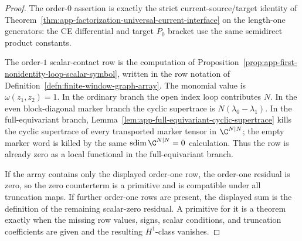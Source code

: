 \begin{proof}
  The order-\(0\) assertion is exactly the strict current-source/target
  identity of Theorem~\ref{thm:app-factorization-universal-current-interface}
  on the length-one generators: the CE differential and target \(P_0\)
  bracket use the same semidirect product constants.

  The order-\(1\) scalar-contact row is the computation of
  Proposition~\ref{prop:app-first-nonidentity-loop-scalar-symbol}, written in
  the row notation of Definition~\ref{defn:finite-window-graph-array}.  The
  monomial value is \(\omega(z_1,z_2)=1\).  In the ordinary branch the open
  index loop contributes \(N\).  In the even block-diagonal marker branch
  the cyclic supertrace is \(N(\lambda_0-\lambda_1)\).  In the
  full-equivariant branch, Lemma~\ref{lem:app-full-equivariant-cyclic-supertrace}
  kills the cyclic supertrace of every transported marker tensor in
  \(\C^{N|N}\); the empty marker word is killed by the same
  \(\operatorname{sdim}\C^{N|N}=0\) calculation.  Thus the row is already
  zero as a local functional in the full-equivariant branch.

  If the array contains only the displayed order-one row, the order-one residual is zero,
  so the zero counterterm is a primitive and is compatible under all
  truncation maps.  If further order-one rows are present, the displayed sum
  is the definition of the remaining scalar-zero residual.  A primitive for
  it is a theorem exactly when the missing row values, signs, scalar conditions,
  and truncation coefficients are given and the resulting \(H^1\)-class
  vanishes.
\end{proof}

